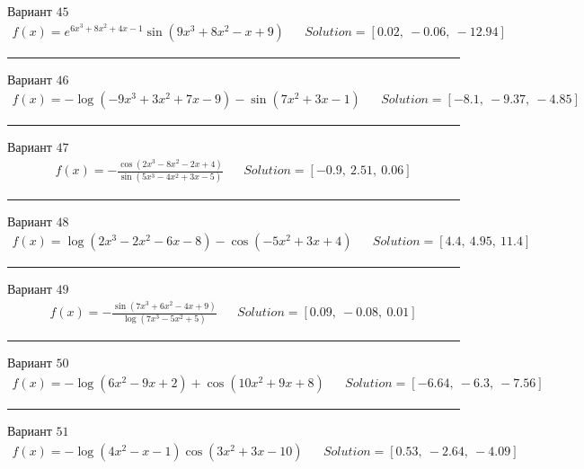 \documentclass[11pt]{report}
\begin{document}
Вариант \(45\)
\begin{align*}
    f(x) = e^{6 x^{3} + 8 x^{2} + 4 x - 1} \sin{\left(9 x^{3} + 8 x^{2} - x + 9 \right)} && Solution = \left[ 0.02, \  -0.06, \  -12.94\right]
\end{align*}
\begin{center}
    \noindent\rule{8cm}{0.4pt}
\end{center}
Вариант \(46\)
\begin{align*}
    f(x) = - \log{\left(- 9 x^{3} + 3 x^{2} + 7 x - 9 \right)} - \sin{\left(7 x^{2} + 3 x - 1 \right)} && Solution = \left[ -8.1, \  -9.37, \  -4.85\right]
\end{align*}
\begin{center}
    \noindent\rule{8cm}{0.4pt}
\end{center}
Вариант \(47\)
\begin{align*}
    f(x) = - \frac{\cos{\left(2 x^{3} - 8 x^{2} - 2 x + 4 \right)}}{\sin{\left(5 x^{3} - 4 x^{2} + 3 x - 5 \right)}} && Solution = \left[ -0.9, \  2.51, \  0.06\right]
\end{align*}
\begin{center}
    \noindent\rule{8cm}{0.4pt}
\end{center}
Вариант \(48\)
\begin{align*}
    f(x) = \log{\left(2 x^{3} - 2 x^{2} - 6 x - 8 \right)} - \cos{\left(- 5 x^{2} + 3 x + 4 \right)} && Solution = \left[ 4.4, \  4.95, \  11.4\right]
\end{align*}
\begin{center}
    \noindent\rule{8cm}{0.4pt}
\end{center}
Вариант \(49\)
\begin{align*}
    f(x) = - \frac{\sin{\left(7 x^{3} + 6 x^{2} - 4 x + 9 \right)}}{\log{\left(7 x^{3} - 5 x^{2} + 5 \right)}} && Solution = \left[ 0.09, \  -0.08, \  0.01\right]
\end{align*}
\begin{center}
    \noindent\rule{8cm}{0.4pt}
\end{center}
Вариант \(50\)
\begin{align*}
    f(x) = - \log{\left(6 x^{2} - 9 x + 2 \right)} + \cos{\left(10 x^{2} + 9 x + 8 \right)} && Solution = \left[ -6.64, \  -6.3, \  -7.56\right]
\end{align*}
\begin{center}
    \noindent\rule{8cm}{0.4pt}
\end{center}
Вариант \(51\)
\begin{align*}
    f(x) = - \log{\left(4 x^{2} - x - 1 \right)} \cos{\left(3 x^{2} + 3 x - 10 \right)} && Solution = \left[ 0.53, \  -2.64, \  -4.09\right]
\end{align*}
\end{document}
